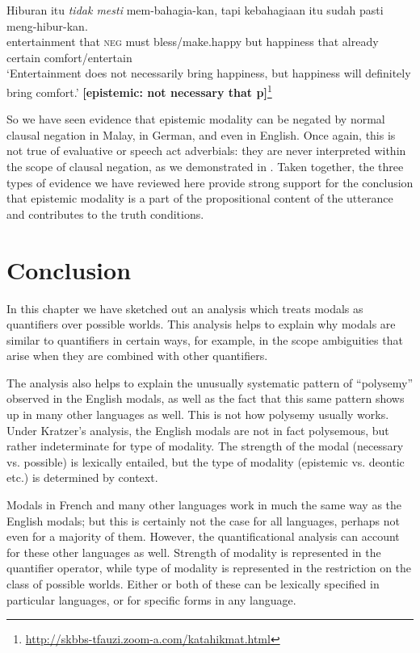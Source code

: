 \ex 
\gll  Hiburan  itu  \textit{tidak  mesti}  mem-bahagia-kan,  tapi kebahagiaan  itu  sudah  pasti  meng-hibur-kan.\\
entertainment  that  \textsc{neg}  must  bless/make.happy  but happiness  that  already  certain  comfort/entertain\\
\glt ‘Entertainment does not necessarily bring happiness, but happiness will definitely bring comfort.’ \textbf{[epistemic: not necessary that p]}\footnote{\url{http://skbbs-tfauzi.zoom-a.com/katahikmat.html}}
\z
\z

So we have seen evidence that epistemic modality can be negated by normal clausal negation in Malay, in German, and even in English. Once again, this is not true of evaluative or speech act adverbials: they are never interpreted within the scope of clausal negation, as we demonstrated in . Taken together, the three types of evidence we have reviewed here provide strong support for the conclusion that epistemic modality is a part of the propositional content of the utterance and contributes to the truth conditions.


\section{Conclusion}\label{sec:16.6}

In this chapter we have sketched out an analysis which treats modals as quantifiers over possible worlds. This analysis helps to explain why modals are similar to quantifiers in certain ways, for example, in the scope ambiguities that arise when they are combined with other quantifiers.



The analysis also helps to explain the unusually systematic pattern of “polysemy” observed in the English modals, as well as the fact that this same pattern shows up in many other languages as well. This is not how polysemy usually works. Under Kratzer’s analysis, the English modals are not in fact polysemous, but rather indeterminate for type of modality. The strength of the modal (necessary vs. possible) is lexically entailed, but the type of modality (epistemic vs. deontic etc.) is determined by context.



Modals in French and many other languages work in much the same way as the English modals; but this is certainly not the case for all languages, perhaps not even for a majority of them. However, the quantificational analysis can account for these other languages as well. Strength of modality is represented in the quantifier operator, while type of modality is represented in the restriction on the class of possible worlds. Either or both of these can be lexically specified in particular languages, or for specific forms in any language.



